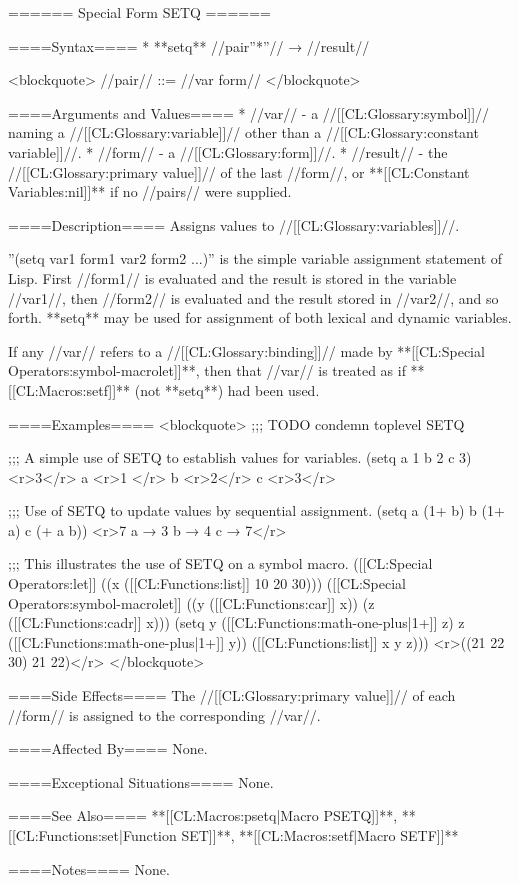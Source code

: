 ====== Special Form SETQ ======

====Syntax====
  * **setq** //{pair''*''}// → //result//
  
<blockquote>
//pair// ::= //var form//
</blockquote>

====Arguments and Values====
  * //var// - a //[[CL:Glossary:symbol]]// naming a //[[CL:Glossary:variable]]// other than a //[[CL:Glossary:constant variable]]//.
  * //form// - a //[[CL:Glossary:form]]//.
  * //result// - the //[[CL:Glossary:primary value]]// of the last //form//, or **[[CL:Constant Variables:nil]]** if no //pairs// were supplied.

====Description====
Assigns values to //[[CL:Glossary:variables]]//.

''(setq var1 form1 var2 form2 ...)'' is the simple variable assignment statement of Lisp. First //form1// is evaluated and the result is stored in the variable //var1//, then //form2// is evaluated and the result stored in //var2//, and so forth. **setq** may be used for assignment of both lexical and dynamic variables.

If any //var// refers to a //[[CL:Glossary:binding]]// made by **[[CL:Special Operators:symbol-macrolet]]**, then that //var// is treated as if **[[CL:Macros:setf]]** (not **setq**) had been used.

====Examples====
<blockquote>
;;; TODO condemn toplevel SETQ

;;; A simple use of SETQ to establish values for variables. 
(setq a 1 b 2 c 3) <r>3</r>
a <r>1 </r>
b <r>2</r>
c <r>3</r>

;;; Use of SETQ to update values by sequential assignment. 
(setq a (1+ b) b (1+ a) c (+ a b)) <r>7 a → 3 b → 4 c → 7</r>

;;; This illustrates the use of SETQ on a symbol macro. 
([[CL:Special Operators:let]] ((x ([[CL:Functions:list]] 10 20 30)))
  ([[CL:Special Operators:symbol-macrolet]] ((y ([[CL:Functions:car]] x)) (z ([[CL:Functions:cadr]] x))) 
    (setq y ([[CL:Functions:math-one-plus|1+]] z) z ([[CL:Functions:math-one-plus|1+]] y))
    ([[CL:Functions:list]] x y z))) <r>((21 22 30) 21 22)</r>
</blockquote>

====Side Effects====
The //[[CL:Glossary:primary value]]// of each //form// is assigned to the corresponding //var//.

====Affected By====
None.

====Exceptional Situations====
None.

====See Also====
**[[CL:Macros:psetq|Macro PSETQ]]**, **[[CL:Functions:set|Function SET]]**, **[[CL:Macros:setf|Macro SETF]]**

====Notes====
None.

